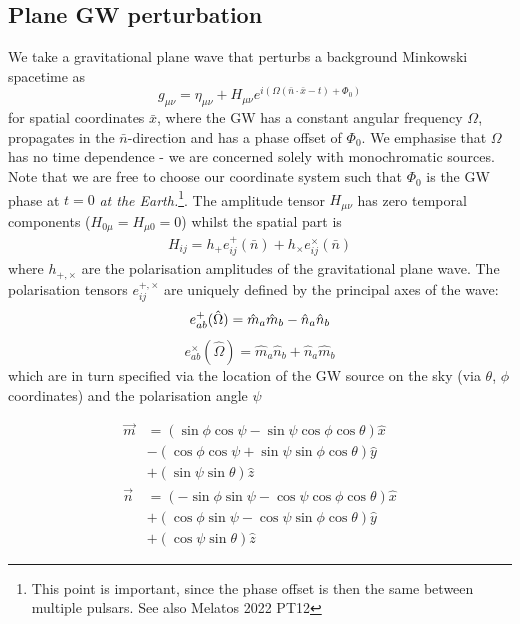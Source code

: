 \documentclass[fleqn,usenatbib,useAMS]{mnras}
\begin{document}
\subsection{Plane GW perturbation}
We take a gravitational plane wave that perturbs a background Minkowski spacetime as
\begin{equation}
	g_{\mu \nu} = \eta_{\mu \nu} + H_{\mu \nu} e^{i(\Omega(\bar{n} \cdot \bar{x} - t) + \Phi_0)	}
\end{equation}
for spatial coordinates $\bar{x}$, where the GW has a constant angular frequency $\Omega$, propagates in the $\bar{n}$-direction and has a phase offset of  $\Phi_0$. We emphasise that $\Omega$ has no time dependence - we are concerned solely with monochromatic sources. Note that we are free to choose our coordinate system such that $\Phi_0$ is the GW phase at $t=0$ \textit{at the Earth.}\footnote{This point is important, since the phase offset is then the same between multiple pulsars. See also Melatos 2022 PT12}. The amplitude tensor $H_{\mu \nu}$ has zero temporal components ($H_{0 \mu} = H_{\mu 0} = 0$) whilst the spatial part is
\begin{align}
	H_{ij} = h_+ e_{ij}^+(\bar{n}) + h_{\times} e_{ij}^{\times}(\bar{n})
\end{align}
where  $h_{+,\times}$ are the polarisation amplitudes of the gravitational plane wave. The polarisation tensors $e_{ij}^{+,\times}$ are uniquely defined by the principal axes of the wave:
\begin{equation}
	e_{a b}^{+}(\hat{\Omega}) =\hat{m}_a \hat{m}_b-\hat{n}_a \hat{n}_b \\
\end{equation}
\begin{equation}
		e_{a b}^{\times}(\hat{\Omega}) =\hat{m}_a \hat{n}_b+\hat{n}_a \hat{m}_b
\end{equation}
which are in turn specified via the location of the GW source on the sky (via $\theta$, $\phi$ coordinates) and the polarisation angle $\psi$



\begin{align}
	\vec{m} & =(\sin \phi \cos \psi-\sin \psi \cos \phi \cos \theta) \hat{x} \nonumber \\
	& -(\cos \phi \cos \psi+\sin \psi \sin \phi \cos \theta) \hat{y} \nonumber \\
	& +(\sin \psi \sin \theta) \hat{z} \\
	\vec{n} & =(-\sin \phi \sin \psi-\cos \psi \cos \phi \cos \theta) \hat{x} \nonumber \\
	& +(\cos \phi \sin \psi-\cos \psi \sin \phi \cos \theta) \hat{y}\nonumber  \\
	& +(\cos \psi \sin \theta) \hat{z}
\end{align}
\end{document}
